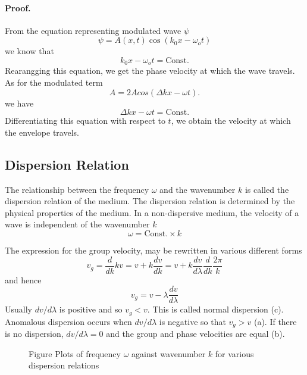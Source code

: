 \documentclass[../../../main.tex]{subfiles}
\begin{document}
\paragraph{Proof.} From the equation representing modulated wave $\psi$
\begin{equation*}
    \psi=A(x, t) \cos(k_0x - \omega_ot) 
\end{equation*}
we know that 
\begin{equation*}
    k_0x - \omega_ot=\text{Const.}
\end{equation*}
Rearangging this equation, we get the phase velocity at which the wave travels. As for the modulated term
\begin{equation*}
    A=2A cos( \Delta k x- \omega t).
\end{equation*}
we have 
\begin{equation*}
    \Delta k x- \omega t=\text{Const.}
\end{equation*}
Differentiating this equation with respect to $t$, we obtain the velocity at which the envelope travels.

\subsection{Dispersion Relation}
The relationship between the frequency $\omega$ and the wavenumber $k$ is called the dispersion relation of the medium. The dispersion relation is determined by the physical properties of the medium. In a non-dispersive medium, the velocity of a wave is independent of the wavenumber $k$
\begin{equation*}
    \omega=\text{Const.}\times k
\end{equation*}

The expression for the group velocity, may be rewritten in various different forms
\begin{equation*}
    v_g=\frac{d}{dk}kv=v+k\frac{dv}{dk}=v+k\frac{dv}{d\lambda}\frac{d}{dk} \frac{2\pi}{k}
\end{equation*}
and hence
\begin{equation*}
    v_g=v-\lambda\frac{dv}{d\lambda}
\end{equation*}
Usually $dv/d\lambda$ is positive and so $v_g < v$. This is called normal dispersion (c). Anomalous dispersion occurs when $dv/d\lambda$ is negative so that $v_g > v$ (a). If there is no dispersion, $dv/d\lambda = 0$ and the group and phase velocities are equal (b).
\begin{figure}
    \centering
    \caption*{Figure Plots of frequency $\omega$ against wavenumber $k$ for various dispersion relations}
\end{figure}
\end{document}
